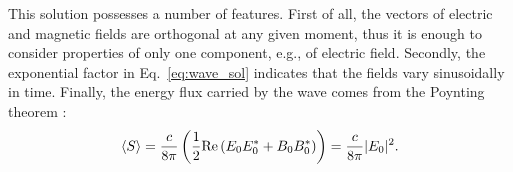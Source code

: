 This solution possesses a number of features.
First of all, the vectors of electric and magnetic fields are orthogonal at any given moment, thus it is enough to consider properties of only one component, e.g., of electric field.
Secondly, the exponential factor in Eq.~\ref{eq:wave_sol} indicates that the fields vary sinusoidally in time.
Finally, the energy flux carried by the wave
comes from the Poynting theorem \citep{RadiationProcesses}:
\begin{equation}
    \label{eq:poynting}
\langle S \rangle = \frac{c}{8\pi}\left(\frac{1}{2}\mathrm{Re}\left(E_0E_0^* + B_0B_0^*\right)\right) = \frac{c}{8\pi}|E_0|^2.
\end{equation}

